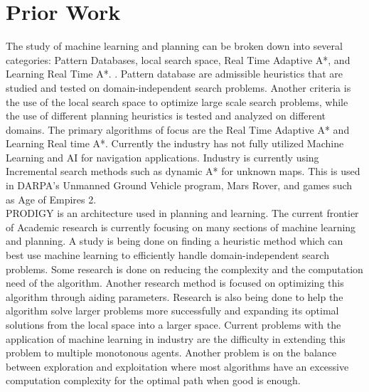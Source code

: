 \documentclass[tog]{acmsiggraph}
\begin{document}
\section{Prior Work}
\indent The study of machine learning and planning can be broken down into several categories: Pattern Databases, local search space, Real Time Adaptive A*, and Learning Real Time A*. . Pattern database are admissible heuristics that are studied and tested on domain-independent search problems. Another criteria is the use of the local search space to optimize large scale search problems, while the use of different planning heuristics is tested and analyzed on different domains. The primary algorithms of focus are the Real Time Adaptive A* and Learning Real time A*. Currently the industry has not fully utilized Machine Learning and AI for navigation applications. Industry is currently using Incremental search methods such as dynamic A* for unknown maps. This is used in DARPA’s Unmanned Ground Vehicle program, Mars Rover, and games such as Age of Empires 2. 
\\
\indent PRODIGY is an architecture used in planning and learning. The current frontier of Academic research is currently focusing on many sections of machine learning and planning. A study is being done on finding a heuristic method which can best use machine learning to efficiently handle domain-independent search problems. Some research is done on reducing the complexity and the computation need of the algorithm. Another research method is focused on optimizing this algorithm through aiding parameters. Research is also being done to help the algorithm solve larger problems more successfully and expanding its optimal solutions from the local space into a larger space. Current problems with the application of machine learning in industry are the difficulty in extending this problem to multiple monotonous agents. Another problem is on the balance between exploration and exploitation where most algorithms have an excessive computation complexity for the optimal path when good is enough.
\end{document}

